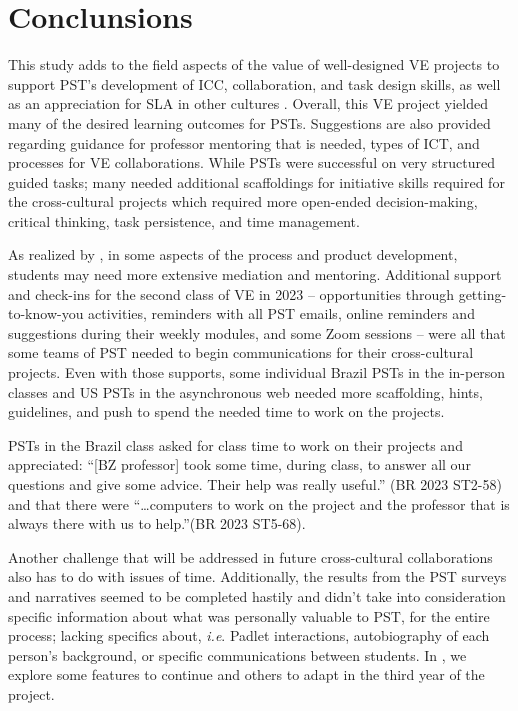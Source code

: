 \section{Conclunsions} \label{sec-conclusions}

This study adds to the field aspects of the value of well-designed VE
projects to support PST's development of ICC, collaboration, and task
design skills, as well as an appreciation for SLA in other cultures
\cite{hanks2019research}. Overall, this VE project yielded many of the desired
learning outcomes for PSTs. Suggestions are also provided regarding
guidance for professor mentoring that is needed, types of ICT, and
processes for VE collaborations. While PSTs were successful on very
structured guided tasks; many needed additional scaffoldings for
initiative skills required for the cross-cultural projects which
required more open-ended decision-making, critical thinking, task
persistence, and time management.

As realized by \textcite{fuchs2022value}, in some aspects of the
process and product development, students may need more extensive
mediation and mentoring. Additional support and check-ins for the second
class of VE in 2023 -- opportunities through getting-to-know-you
activities, reminders with all PST emails, online reminders and
suggestions during their weekly modules, and some Zoom sessions -- were
all that some teams of PST needed to begin communications for their
cross-cultural projects. Even with those supports, some individual
Brazil PSTs in the in-person classes and US PSTs in the asynchronous web
needed more scaffolding, hints, guidelines, and push to spend the needed
time to work on the projects.

PSTs in the Brazil class asked for class time to work on their projects
and appreciated: \enquote{[BZ professor] took some time, during
class, to answer all our questions and give some advice. Their help was
really useful.} (BR 2023 ST2-58) and that there were
\enquote{\ldots computers to work on the project and the professor that
is always there with us to help.}(BR 2023 ST5-68).
		
Another challenge that will be addressed in future cross-cultural
collaborations also has to do with issues of time. Additionally, the results from the
PST surveys and narratives seemed to be completed hastily and didn't
take into consideration specific information about what was personally
valuable to PST, for the entire process; lacking specifics about,
\emph{i.e}. Padlet interactions, autobiography of each person's
background, or specific communications between students. In , we
explore some features to continue and others to adapt in the third year
of the project.

